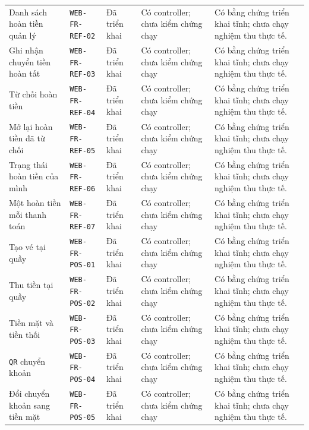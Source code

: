 \begin{longtable}{@{}P{0.19000\SRSWidth}P{0.18000\SRSWidth}P{0.15000\SRSWidth}P{0.20000\SRSWidth}P{0.28000\SRSWidth}@{}}
Danh sách hoàn tiền quản lý & \texttt{WEB-\allowbreak{}FR-\allowbreak{}REF-\allowbreak{}02} & Đã triển khai & Có controller; chưa kiểm chứng chạy & Có bằng chứng triển khai tĩnh; chưa chạy nghiệm thu thực tế. \\[3pt]
Ghi nhận chuyển tiền hoàn tất & \texttt{WEB-\allowbreak{}FR-\allowbreak{}REF-\allowbreak{}03} & Đã triển khai & Có controller; chưa kiểm chứng chạy & Có bằng chứng triển khai tĩnh; chưa chạy nghiệm thu thực tế. \\[3pt]
Từ chối hoàn tiền & \texttt{WEB-\allowbreak{}FR-\allowbreak{}REF-\allowbreak{}04} & Đã triển khai & Có controller; chưa kiểm chứng chạy & Có bằng chứng triển khai tĩnh; chưa chạy nghiệm thu thực tế. \\[3pt]
Mở lại hoàn tiền đã từ chối & \texttt{WEB-\allowbreak{}FR-\allowbreak{}REF-\allowbreak{}05} & Đã triển khai & Có controller; chưa kiểm chứng chạy & Có bằng chứng triển khai tĩnh; chưa chạy nghiệm thu thực tế. \\[3pt]
Trạng thái hoàn tiền của mình & \texttt{WEB-\allowbreak{}FR-\allowbreak{}REF-\allowbreak{}06} & Đã triển khai & Có controller; chưa kiểm chứng chạy & Có bằng chứng triển khai tĩnh; chưa chạy nghiệm thu thực tế. \\[3pt]
Một hoàn tiền mỗi thanh toán & \texttt{WEB-\allowbreak{}FR-\allowbreak{}REF-\allowbreak{}07} & Đã triển khai & Có controller; chưa kiểm chứng chạy & Có bằng chứng triển khai tĩnh; chưa chạy nghiệm thu thực tế. \\[3pt]
Tạo vé tại quầy & \texttt{WEB-\allowbreak{}FR-\allowbreak{}POS-\allowbreak{}01} & Đã triển khai & Có controller; chưa kiểm chứng chạy & Có bằng chứng triển khai tĩnh; chưa chạy nghiệm thu thực tế. \\[3pt]
Thu tiền tại quầy & \texttt{WEB-\allowbreak{}FR-\allowbreak{}POS-\allowbreak{}02} & Đã triển khai & Có controller; chưa kiểm chứng chạy & Có bằng chứng triển khai tĩnh; chưa chạy nghiệm thu thực tế. \\[3pt]
Tiền mặt và tiền thối & \texttt{WEB-\allowbreak{}FR-\allowbreak{}POS-\allowbreak{}03} & Đã triển khai & Có controller; chưa kiểm chứng chạy & Có bằng chứng triển khai tĩnh; chưa chạy nghiệm thu thực tế. \\[3pt]
\texttt{QR} chuyển khoản & \texttt{WEB-\allowbreak{}FR-\allowbreak{}POS-\allowbreak{}04} & Đã triển khai & Có controller; chưa kiểm chứng chạy & Có bằng chứng triển khai tĩnh; chưa chạy nghiệm thu thực tế. \\[3pt]
Đổi chuyển khoản sang tiền mặt & \texttt{WEB-\allowbreak{}FR-\allowbreak{}POS-\allowbreak{}05} & Đã triển khai & Có controller; chưa kiểm chứng chạy & Có bằng chứng triển khai tĩnh; chưa chạy nghiệm thu thực tế. \\[3pt]

\end{longtable}
